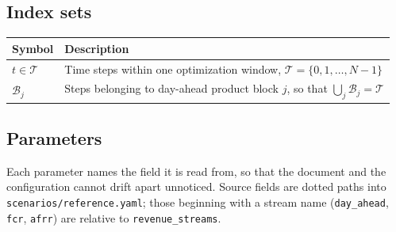 \documentclass[11pt,a4paper]{article}
\numberwithin{equation}{section}
\begin{document}
\subsection{Index sets}

\begin{tabular}{@{}l >{\raggedright\arraybackslash}p{12cm}@{}}
\toprule
Symbol & Description \\
\midrule
$t \in \mathcal{T}$ & Time steps within one optimization window,
                      $\mathcal{T} = \{0, 1, \dots, N-1\}$ \\
$\mathcal{B}_j$     & Steps belonging to day-ahead product block $j$, so that
                      $\bigcup_j \mathcal{B}_j = \mathcal{T}$ \\
\bottomrule
\end{tabular}

\subsection{Parameters}

Each parameter names the field it is read from, so that the document and the
configuration cannot drift apart unnoticed. Source fields are dotted paths into
\nolinkurl{scenarios/reference.yaml}; those beginning with a stream name
(\nolinkurl{day_ahead}, \texttt{fcr}, \texttt{afrr}) are relative to
\nolinkurl{revenue_streams}.
\end{document}
